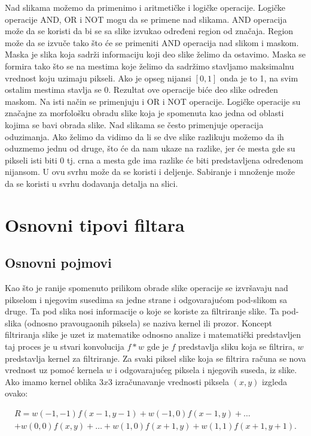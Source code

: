 \documentclass[a4paper,12pt,titlepage]{article}
\begin{document}
Nad slikama možemo da primenimo i aritmetičke i logičke operacije. Logičke operacije AND, OR i NOT mogu da se primene nad slikama. AND operacija može da se koristi da bi se sa slike izvukao određeni region od značaja. Region može da se izvuče tako što će se primeniti AND operacija nad slikom i maskom. Maska je slika koja sadrži informaciju koji deo slike želimo da ostavimo. Maska se formira tako što se na mestima koje želimo da sadržimo stavljamo maksimalnu vrednost koju uzimaju pikseli. Ako je opseg nijansi $[0, 1]$ onda je to 1, na svim ostalim mestima stavlja se 0. Rezultat ove operacije biće deo slike određen maskom. Na isti način se primenjuju i OR i NOT operacije. Logičke operacije su značajne za morfološku obradu slike koja je spomenuta kao jedna od oblasti kojima se bavi obrada slike. Nad slikama se često primenjuje operacija oduzimanja. Ako želimo da vidimo da li se dve slike razlikuju možemo da ih oduzmemo jednu od druge, što će da nam ukaze na razlike, jer će mesta gde su pikseli isti biti 0 tj. crna a mesta gde ima razlike će biti predstavljena određenom nijansom. U ovu svrhu može da se koristi i deljenje. Sabiranje i množenje može da se koristi u svrhu dodavanja detalja na slici.

\section{Osnovni tipovi filtara}\label{3}%

\subsection{Osnovni pojmovi}%

Kao što je ranije spomenuto prilikom obrade slike operacije se izvršavaju nad pikselom i njegovim susedima sa jedne strane i odgovarajućom pod-slikom sa druge. Ta pod slika nosi informacije o koje se koriste za filtriranje slike. Ta pod-slika (odnosno pravougaonih piksela) se naziva kernel ili prozor. Koncept filtriranja slike je uzet iz matematike odnosno analize i matematički predstavljen taj proces je u stvari konvolucija $f * w$ gde je $f$ predstavlja sliku koja se filtrira, $w$ predstavlja kernel za filtriranje. Za svaki piksel slike koja se filtrira računa se nova vrednost uz pomoć kernela $w$ i odgovarajućeg piksela i njegovih suseda, iz slike. Ako imamo kernel oblika $3 x 3$ izračunavanje vrednosti piksela $(x, y)$ izgleda ovako:

\begin{equation}\label{eq:conv1}
\begin{split}
R = w(-1, -1)f(x - 1, y - 1) + w(-1, 0)f(x - 1, y) + \dots \\
+ w(0, 0)f(x, y) + \dots + w(1, 0)f(x + 1, y) + w(1, 1)f(x + 1, y + 1).
\end{split}
\end{equation}
\end{document}
